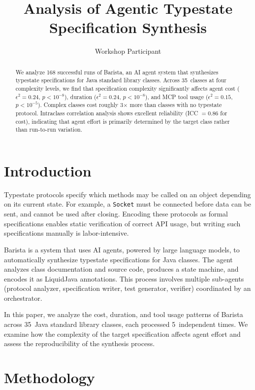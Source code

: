 \documentclass[sigconf]{acmart}
\title{Analysis of Agentic Typestate Specification Synthesis}
\author{Workshop Participant}
\affiliation{\institution{}}
\begin{document}
\begin{abstract}
We analyze 168 successful runs of Barista, an AI agent system that synthesizes typestate specifications for Java standard library classes. Across 35~classes at four complexity levels, we find that specification complexity significantly affects agent cost ($\epsilon^2 = 0.24$, $p < 10^{-8}$), duration ($\epsilon^2 = 0.24$, $p < 10^{-8}$), and MCP tool usage ($\epsilon^2 = 0.15$, $p < 10^{-5}$). Complex classes cost roughly 3$\times$ more than classes with no typestate protocol. Intraclass correlation analysis shows excellent reliability (ICC $= 0.86$ for cost), indicating that agent effort is primarily determined by the target class rather than run-to-run variation.
\end{abstract}

\maketitle

\section{Introduction}

Typestate protocols specify which methods may be called on an object depending on its current state. For example, a \texttt{Socket} must be connected before data can be sent, and cannot be used after closing. Encoding these protocols as formal specifications enables static verification of correct API usage, but writing such specifications manually is labor-intensive.

Barista is a system that uses AI agents, powered by large language models, to automatically synthesize typestate specifications for Java classes. The agent analyzes class documentation and source code, produces a state machine, and encodes it as LiquidJava annotations. This process involves multiple sub-agents (protocol analyzer, specification writer, test generator, verifier) coordinated by an orchestrator.

In this paper, we analyze the cost, duration, and tool usage patterns of Barista across 35~Java standard library classes, each processed 5~independent times. We examine how the complexity of the target specification affects agent effort and assess the reproducibility of the synthesis process.

\section{Methodology}
\end{document}
